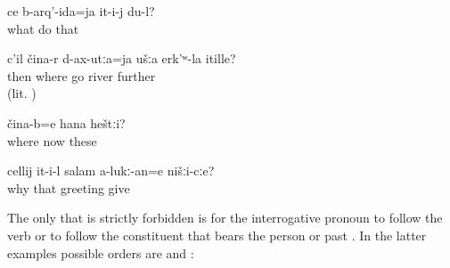 \begin{exe}
	\ex	\label{ex:‎[He does not leave me alone], what should I do with him}
	\gll	ce	b-arq'-ida=ja	it-i-j	du-l?\\
		what	do	that	\\
	\glt	{}

	\ex	\label{ex:‎‎‎Then from where do you cross the river}
	\gll	c'il	čina-r	d-ax-utːa=ja	ušːa	erk'ʷ-la itille?\\
		then	where	go		river	further\\
	\glt	{} (lit. )

	\ex	\label{ex:‎Where are these now? (these = people)}
	\gll	čina-b=e	hana	heštːi?\\
		where	now	these	\\
	\glt	{}

	\ex	\label{ex:Why will he not greet us}
	\gll	cellij	it-i-l	salam	a-lukː-an=e	nišːi-cːe?\\
		why	that	greeting	give		\\
	\glt	{}
\end{exe}

The only  that is strictly forbidden is for the interrogative pronoun to follow the verb  or to follow the constituent that bears the person  or past  . In the latter examples possible orders are  and :

\begin{exe}

\end{exe}

